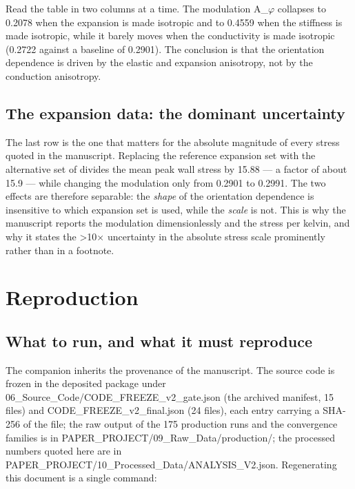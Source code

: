 \documentclass[preprint,12pt]{elsarticle}
\begin{document}
Read the table in two columns at a time. The modulation A\_$\varphi$ collapses to 0.2078 when the expansion is made isotropic and to 0.4559 when the stiffness is made isotropic, while it barely moves when the conductivity is made isotropic (0.2722 against a baseline of 0.2901). The conclusion is that the orientation dependence is driven by the elastic and expansion anisotropy, not by the conduction anisotropy.

\subsection{The expansion data: the dominant uncertainty}
\label{sec:10.2}

The last row is the one that matters for the absolute magnitude of every stress quoted in the manuscript. Replacing the reference expansion set with the alternative set of \cite{huang2025} divides the mean peak wall stress by 15.88 --- a factor of about 15.9 --- while changing the modulation only from 0.2901 to 0.2991. The two effects are therefore separable: the \emph{shape} of the orientation dependence is insensitive to which expansion set is used, while the \emph{scale} is not. This is why the manuscript reports the modulation dimensionlessly and the stress per kelvin, and why it states the >10$\times$ uncertainty in the absolute stress scale prominently rather than in a footnote.

\section{Reproduction}
\label{sec:11}

\subsection{What to run, and what it must reproduce}
\label{sec:11.1}

The companion inherits the provenance of the manuscript. The source code is frozen in the deposited package under 06\_Source\_Code/CODE\_FREEZE\_v2\_gate.json (the archived manifest, 15 files) and CODE\_FREEZE\_v2\_final.json (24 files), each entry carrying a SHA-256 of the file; the raw output of the 175 production runs and the convergence families is in PAPER\_PROJECT/09\_Raw\_Data/production/; the processed numbers quoted here are in PAPER\_PROJECT/10\_Processed\_Data/ANALYSIS\_V2.json. Regenerating this document is a single command:
\end{document}
